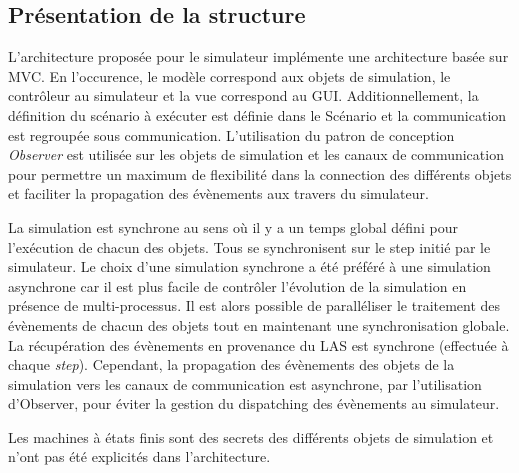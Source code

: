 \subsection{Présentation de la structure}

	L'architecture proposée pour le simulateur implémente une architecture
	basée sur MVC.  En l'occurence, le modèle correspond aux objets de
	simulation, le contrôleur au simulateur et la vue correspond au GUI.
	Additionnellement, la définition du scénario à exécuter est définie dans le
	Scénario et la communication est regroupée sous communication.
	L'utilisation du patron de conception \textit{Observer} est utilisée sur
	les objets de simulation et les canaux de communication pour permettre un
	maximum de flexibilité dans la connection des différents objets et
	faciliter la propagation des évènements aux travers du simulateur.

	La simulation est synchrone au sens où il y a un temps global défini pour
	l'exécution de chacun des objets.  Tous se synchronisent sur le step initié
	par le simulateur.  Le choix d'une simulation synchrone a été préféré à une
	simulation asynchrone car il est plus facile de contrôler l'évolution de la
	simulation en présence de multi-processus.  Il est alors possible de
	paralléliser le traitement des évènements de chacun des objets tout en
	maintenant une synchronisation globale.  La récupération des évènements en
	provenance du LAS est synchrone (effectuée à chaque \textit{step}).
	Cependant, la propagation des évènements des objets de la simulation vers
	les canaux de communication est asynchrone, par l'utilisation d'Observer,
	pour éviter la gestion du dispatching des évènements au simulateur.

	Les machines à états finis sont des secrets des différents objets de
	simulation et n'ont pas été explicités dans l'architecture.
